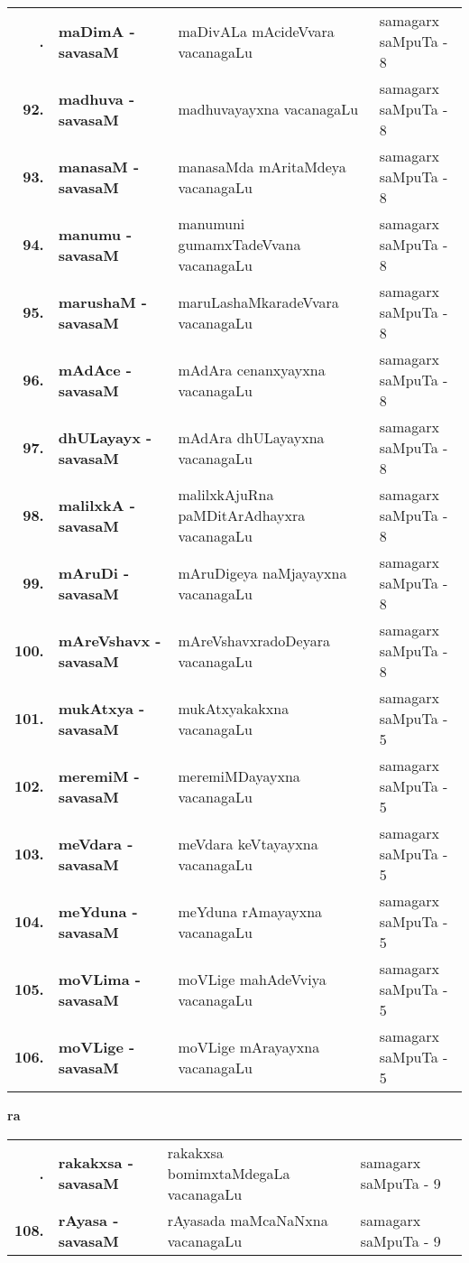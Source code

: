 {\renewcommand{\arraystretch}{1.3}
\begin{longtable}{>{\bf}r>{\bf}l>{\raggedright}p{8cm}l}
\endfirsthead
\endhead
\endfoot
\endlastfoot
91. & maDimA - savasaM &  maDivALa mAcideVvara vacanagaLu & samagarx saMpuTa - 8\\
92. & madhuva - savasaM &  madhuvayayxna vacanagaLu & samagarx saMpuTa - 8\\
93. & manasaM - savasaM & manasaMda mAritaMdeya vacanagaLu & samagarx saMpuTa - 8 \\
94. & manumu - savasaM & manumuni gumamxTadeVvana vacanagaLu & samagarx saMpuTa - 8 \\
95. & marushaM - savasaM & maruLashaMkaradeVvara vacanagaLu & samagarx saMpuTa - 8 \\
96. & mAdAce - savasaM & mAdAra cenanxyayxna vacanagaLu & samagarx saMpuTa - 8 \\
97. & dhULayayx - savasaM & mAdAra dhULayayxna vacanagaLu & samagarx saMpuTa - 8 \\
98. & malilxkA - savasaM & malilxkAjuRna paMDitArAdhayxra vacanagaLu & samagarx saMpuTa - 8 \\
99. & mAruDi - savasaM & mAruDigeya naMjayayxna vacanagaLu & samagarx saMpuTa - 8 \\
100. & mAreVshavx - savasaM & mAreVshavxradoDeyara vacanagaLu & samagarx saMpuTa - 8 \\
101. & mukAtxya - savasaM & mukAtxyakakxna vacanagaLu & samagarx saMpuTa - 5 \\
102. & meremiM - savasaM & meremiMDayayxna vacanagaLu & samagarx saMpuTa - 5 \\
103. & meVdara - savasaM & meVdara keVtayayxna vacanagaLu & samagarx saMpuTa - 5 \\
104. & meYduna - savasaM & meYduna rAmayayxna vacanagaLu & samagarx saMpuTa - 5 \\
105. & moVLima - savasaM & moVLige mahAdeVviya vacanagaLu & samagarx saMpuTa - 5\\
106. & moVLige - savasaM & moVLige mArayayxna vacanagaLu & samagarx saMpuTa - 5 \\
\end{longtable}}
\smallskip

\centerline{\bf ra}

{\renewcommand{\arraystretch}{1.3}
\begin{longtable}{>{\bf}r>{\bf}l>{\raggedright}p{8cm}l}
\endfirsthead
\endhead
\endfoot
\endlastfoot
107. & rakakxsa - savasaM & rakakxsa bomimxtaMdegaLa vacanagaLu &  samagarx saMpuTa - 9\\
108. & rAyasa - savasaM &  rAyasada maMcaNaNxna vacanagaLu & samagarx saMpuTa - 9
\end{longtable}}

